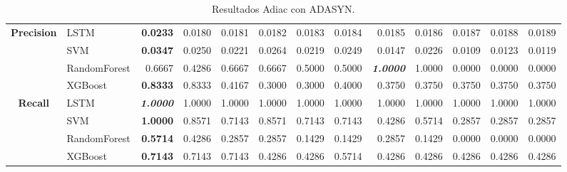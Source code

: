 \begin{table}[H]
\begin{adjustbox}{max width=14cm}
\begin{tabular}{|c|l|r|r|r|r|r|r|r|r|r|r|r|}
			\hline
			\textbf{Precision} &  LSTM & \textbf{  0.0233 } &  0.0180 &  0.0181 &  0.0182 &  0.0183 &  0.0184 &  0.0185 &  0.0186 &  0.0187 &  0.0188 &  0.0189 \\
			&  SVM & \textbf{  0.0347 } &  0.0250 &  0.0221 &  0.0264 &  0.0219 &  0.0249 &  0.0147 &  0.0226 &  0.0109 &  0.0123 &  0.0119 \\
			&  RandomForest &  0.6667 &  0.4286 &  0.6667 &  0.6667 &  0.5000 &  0.5000 & \textit{ \textbf{  1.0000 } } &  1.0000 &  0.0000 &  0.0000 &  0.0000 \\
			&  XGBoost & \textbf{  0.8333 } &  0.8333 &  0.4167 &  0.3000 &  0.3000 &  0.4000 &  0.3750 &  0.3750 &  0.3750 &  0.3750 &  0.3750 \\
			\hline
			\textbf{Recall} &  LSTM & \textit{ \textbf{  1.0000 } } &  1.0000 &  1.0000 &  1.0000 &  1.0000 &  1.0000 &  1.0000 &  1.0000 &  1.0000 &  1.0000 &  1.0000 \\
			&  SVM & \textbf{  1.0000 } &  0.8571 &  0.7143 &  0.8571 &  0.7143 &  0.7143 &  0.4286 &  0.5714 &  0.2857 &  0.2857 &  0.2857 \\
			&  RandomForest & \textbf{  0.5714 } &  0.4286 &  0.2857 &  0.2857 &  0.1429 &  0.1429 &  0.2857 &  0.1429 &  0.0000 &  0.0000 &  0.0000 \\
			&  XGBoost & \textbf{  0.7143 } &  0.7143 &  0.7143 &  0.4286 &  0.4286 &  0.5714 &  0.4286 &  0.4286 &  0.4286 &  0.4286 &  0.4286 \\
			\hline
		\end{tabular}
	\end{adjustbox}
	\caption{Resultados Adiac con ADASYN.}
	\label{tab:Adiac_ADASYN}
\end{table}

